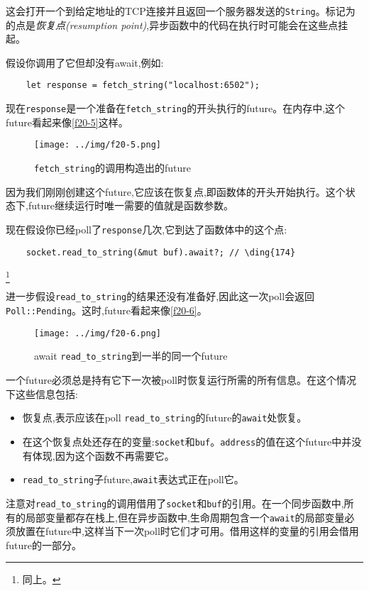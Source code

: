 这会打开一个到给定地址的TCP连接并且返回一个服务器发送的\texttt{String}。标记为的点是\emph{恢复点(resumption point)},异步函数中的代码在执行时可能会在这些点挂起。

假设你调用了它但却没有await,例如:
\begin{verbatim}
    let response = fetch_string("localhost:6502");
\end{verbatim}

现在\texttt{response}是一个准备在\texttt{fetch\_string}的开头执行的future。在内存中,这个future看起来像\autoref{f20-5}这样。

\begin{figure}
    \centering
    \texttt{[image: ../img/f20-5.png]}
    \caption{\texttt{fetch\_string}的调用构造出的future}
    \label{f20-5}
\end{figure}

因为我们刚刚创建这个future,它应该在恢复点,即函数体的开头开始执行。这个状态下,future继续运行时唯一需要的值就是函数参数。

现在假设你已经poll了\texttt{response}几次,它到达了函数体中的这个点:
\begin{verbatim}
    socket.read_to_string(&mut buf).await?; // \ding{174}
\end{verbatim}
\footnote{同上。}

进一步假设\texttt{read\_to\_string}的结果还没有准备好,因此这一次poll会返回\texttt{Poll::Pending}。这时,future看起来像\autoref{f20-6}。

\begin{figure}
    \centering
    \texttt{[image: ../img/f20-6.png]}
    \caption{await \texttt{read\_to\_string}到一半的同一个future}
    \label{f20-6}
\end{figure}

一个future必须总是持有它下一次被poll时恢复运行所需的所有信息。在这个情况下这些信息包括:
\begin{itemize}
    \item 恢复点,表示应该在poll \texttt{read\_to\_string}的future的\texttt{await}处恢复。
    \item 在这个恢复点处还存在的变量:\texttt{socket}和\texttt{buf}。\texttt{address}的值在这个future中并没有体现,因为这个函数不再需要它。
    \item \texttt{read\_to\_string}子future,\texttt{await}表达式正在poll它。
\end{itemize}

注意对\texttt{read\_to\_string}的调用借用了\texttt{socket}和\texttt{buf}的引用。在一个同步函数中,所有的局部变量都存在栈上,但在异步函数中,生命周期包含一个\texttt{await}的局部变量必须放置在future中,这样当下一次poll时它们才可用。借用这样的变量的引用会借用future的一部分。

